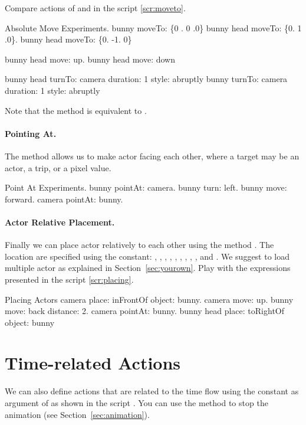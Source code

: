 Compare actions of  and  in the script \ref{scr:moveto}.

\begin{scriptwithtitle}{Absolute Move Experiments.}\label{scr:moveto}
bunny moveTo: \{0 . 0 .0\}
bunny head moveTo: \{0. 1 .0\}.
bunny head moveTo: \{0. -1. 0\}

bunny head move: up.
bunny head move: down

bunny head turnTo: camera duration: 1 style: abruptly
bunny  turnTo: camera duration: 1 style: abruptly
\end{scriptwithtitle}

Note that the method  is equivalent to .

\paragraph{Pointing At.} 
The method  allows us to make actor facing each other, where a target may be an actor, a  trip, or a  pixel value.

\begin{scriptwithtitle}{Point At Experiments.}\label{scr:pointat}
bunny pointAt: camera.
bunny turn: left.
bunny move: forward.
camera pointAt: bunny.
\end{scriptwithtitle}

\paragraph{Actor Relative Placement.} Finally we can place actor relatively to each other using the method . The location are specified using the constant:   , , , , , , , , , and . We suggest to load multiple actor as explained in Section~\ref{sec:yourown}. Play with the expressions presented in the script \ref{scr:placing}.


\begin{scriptwithtitle}{Placing Actors}\label{scr:placing}
camera place: inFrontOf object: bunny.
camera move: up.
bunny move: back distance: 2.
camera pointAt: bunny.
bunny head place: toRightOf object: bunny
\end{scriptwithtitle}

\section{Time-related Actions}
We can also define actions that are related to the time flow using the  constant as argument of  as shown in 
the script . You can use the method  to stop the animation (see Section~\ref{sec:animation}).

